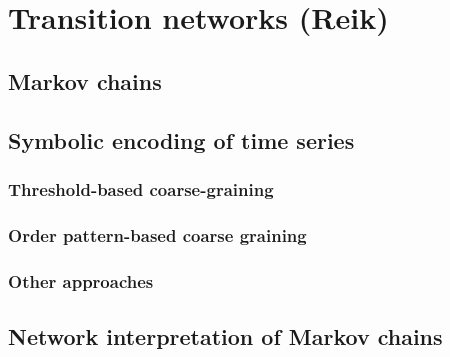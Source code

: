 \section{Transition networks {\bf{(Reik)}}}

	\subsection{Markov chains}
	
	\subsection{Symbolic encoding of time series}
		\subsubsection{Threshold-based coarse-graining}
		\subsubsection{Order pattern-based coarse graining}
		\subsubsection{Other approaches}
		
	\subsection{Network interpretation of Markov chains}